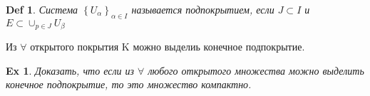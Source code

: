 \documentclass[a5paper, 10pt]{article}
\theoremstyle{plain}
\newtheorem{definition}{Def}
\newtheorem{exersise}{Ex}
\begin{document}
    \begin{definition}
        Система $ \left\{ U_\alpha \right\}_{\alpha \in I}  $ называется подпокрытием, если
        $ J \subset I $ и $ E \subset \cup_{p \in J} U_\beta $
    \end{definition}

    \begin{lemma}
        Из $ \forall  $ открытого покрытия K можно выделиь конечное подпокрытие.
    \end{lemma}

    \begin{exersise}
        Доказать, что если из $ \forall  $ любого открытого множества можно выделить конечное
        подпокрытие, то это множество компактно.
    \end{exersise}
\end{document}
